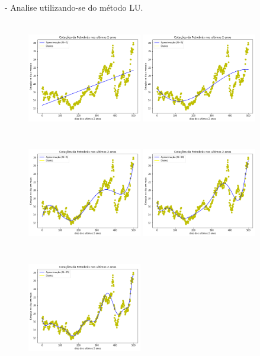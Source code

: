 \documentclass{article}
\begin{document}
\item - Analise utilizando-se do método LU.
\begin{figure}[!htb]
\includegraphics [width=5cm,height=5cm]{LU/G1.png}
\includegraphics [width=5cm,height=5cm]{LU/G3.png}
\includegraphics [width=5cm,height=5cm]{LU/G5.png}
\includegraphics [width=5cm,height=5cm]{LU/G10.png}
\includegraphics [width=5cm,height=5cm]{LU/G15.png}

\end{figure}
\end{document}
